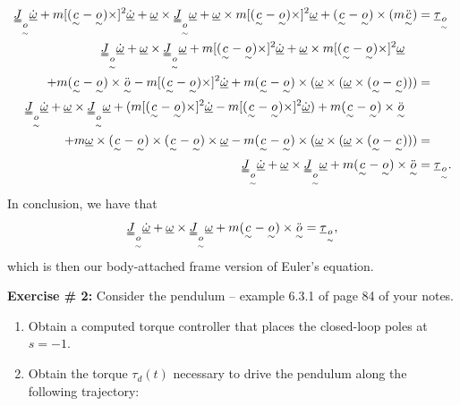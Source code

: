 \documentclass[11pt]{article}
\newcommand{\utilde}[1]{\underset{\sim}{#1}}
\begin{document}
\begin{enumerate}
        \begin{align*}
            \uuline{J}_{\utilde{o}} \dot{\uline{\omega}}+ m[(\utilde{c} - \utilde{o}) \times ]^2 \dot{\uline{\omega}} + \uline{\omega} \times \uuline{J}_{\utilde{o}} \uline{\omega} + \uline{\omega} \times  m[(\utilde{c} - \utilde{o}) \times ]^2\uline{\omega} + (\utilde{c} - \utilde{o}) \times (m\ddot{\utilde{c}}) &= \uline{\tau}_{\utilde{o}}\\
            \uuline{J}_{\utilde{o}} \dot{\uline{\omega}}+\uline{\omega} \times \uuline{J}_{\utilde{o}} \uline{\omega} + m[(\utilde{c} - \utilde{o}) \times ]^2 \dot{\uline{\omega}} + \uline{\omega} \times  m[(\utilde{c} - \utilde{o}) \times ]^2\uline{\omega}  \quad &   \\
           + m (\utilde{c} - \utilde{o}) \times \ddot{\utilde{o}}  - m[(\utilde{c} - \utilde{o}) \times ]^2 \dot{\uline{\omega}} + m(\utilde{c} - \utilde{o}) \times ( \uline{\omega} \times  (\uline{\omega} \times (\utilde{o } - \utilde{c}))) &=\\
           \uuline{J}_{\utilde{o}} \dot{\uline{\omega}}+\uline{\omega} \times \uuline{J}_{\utilde{o}} \uline{\omega} + (m[(\utilde{c} - \utilde{o}) \times ]^2 \dot{\uline{\omega}}-m[(\utilde{c} - \utilde{o}) \times ]^2 \dot{\uline{\omega}}) + m (\utilde{c} - \utilde{o}) \times \ddot{\utilde{o}} \quad &\\
           + m\uline{\omega} \times  (\utilde{c} - \utilde{o}) \times (\utilde{c} - \utilde{o}) \times  \uline{\omega} - m(\utilde{c} - \utilde{o}) \times ( \uline{\omega} \times  (\uline{\omega} \times (\utilde{o } - \utilde{c}))) &=\\
           \uuline{J}_{\utilde{o}} \dot{\uline{\omega}}+\uline{\omega} \times \uuline{J}_{\utilde{o}} \uline{\omega} + m (\utilde{c} - \utilde{o}) \times \ddot{\utilde{o}} &= \uline{\tau}_{\utilde{o}}
        .\end{align*}
        In conclusion, we have that
\[
           \uuline{J}_{\utilde{o}} \dot{\uline{\omega}}+\uline{\omega} \times \uuline{J}_{\utilde{o}} \uline{\omega} + m (\utilde{c} - \utilde{o}) \times \ddot{\utilde{o}} = \uline{\tau}_{\utilde{o}}
,\] 
which is then our body-attached frame version of Euler's equation.

\end{enumerate}

\vspace{1em}

\noindent\textbf{Exercise \# 2:} Consider the pendulum -- example 6.3.1 of page 84 of your notes.
\begin{enumerate}
    \item[(i)] Obtain a computed torque controller that places the closed-loop poles at $s = -1$.
    \item[(ii)] Obtain the torque $\tau_d(t)$ necessary to drive the pendulum along the following trajectory:
\end{enumerate}
\end{document}
